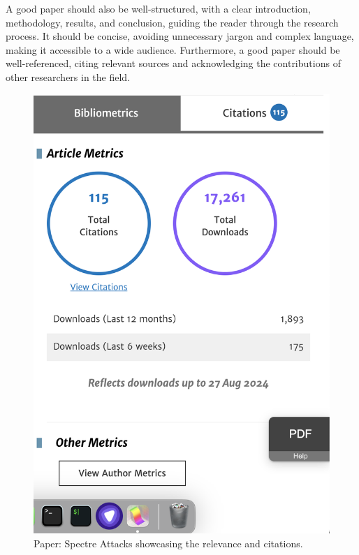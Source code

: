 \documentclass{article}
\begin{document}
A good paper should also be well-structured, with a clear introduction, methodology, results, and conclusion, guiding the reader through the research process. It should be concise, avoiding unnecessary jargon and complex language, making it accessible to a wide audience. Furthermore, a good paper should be well-referenced, citing relevant sources and acknowledging the contributions of other researchers in the field.

\begin{figure}[h]
      \centering
      \includegraphics[width=0.25\linewidth]{Screenshot 2024-09-01 at 6.12.49 PM.png}
      \caption{Paper: Spectre Attacks showcasing the relevance and citations. \cite{10.1145/3399742} }
\end{figure}
\end{document}
